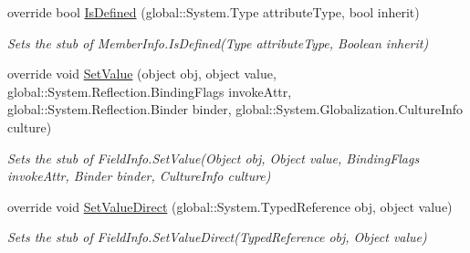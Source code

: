 \begin{DoxyCompactItemize}
override bool \hyperlink{class_system_1_1_reflection_1_1_fakes_1_1_stub_field_info_ad1a86f340add17d346d60a40a600d404}{Is\-Defined} (global\-::\-System.\-Type attribute\-Type, bool inherit)
\begin{DoxyCompactList}\small\item\em Sets the stub of Member\-Info.\-Is\-Defined(\-Type attribute\-Type, Boolean inherit)\end{DoxyCompactList}\item 
override void \hyperlink{class_system_1_1_reflection_1_1_fakes_1_1_stub_field_info_aebfd86af467639f2371d3a51bdc0fd72}{Set\-Value} (object obj, object value, global\-::\-System.\-Reflection.\-Binding\-Flags invoke\-Attr, global\-::\-System.\-Reflection.\-Binder binder, global\-::\-System.\-Globalization.\-Culture\-Info culture)
\begin{DoxyCompactList}\small\item\em Sets the stub of Field\-Info.\-Set\-Value(\-Object obj, Object value, Binding\-Flags invoke\-Attr, Binder binder, Culture\-Info culture)\end{DoxyCompactList}\item 
override void \hyperlink{class_system_1_1_reflection_1_1_fakes_1_1_stub_field_info_a42737ec17229ccf1fb775a239353e2d4}{Set\-Value\-Direct} (global\-::\-System.\-Typed\-Reference obj, object value)
\begin{DoxyCompactList}\small\item\em Sets the stub of Field\-Info.\-Set\-Value\-Direct(\-Typed\-Reference obj, Object value)\end{DoxyCompactList}\end{DoxyCompactItemize}
